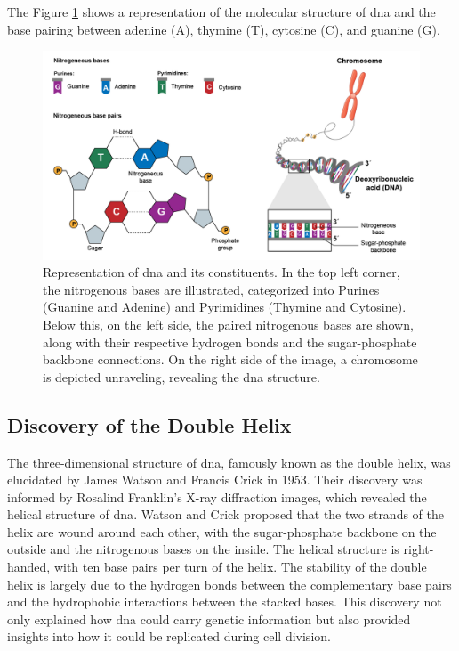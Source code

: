 The Figure \ref{fig:dna} shows a representation of the molecular structure of \ac{dna} and the base pairing between adenine (A), thymine (T), cytosine (C), and guanine (G).

\begin{figure}[H]
    \centering
    \includegraphics[width=1\textwidth]{figs/dna.png}
    \caption{Representation of \ac{dna} and its constituents. In the top left corner, the nitrogenous bases are illustrated, categorized into Purines (Guanine and Adenine) and Pyrimidines (Thymine and Cytosine). Below this, on the left side, the paired nitrogenous bases are shown, along with their respective hydrogen bonds and the sugar-phosphate backbone connections. On the right side of the image, a chromosome is depicted unraveling, revealing the \ac{dna} structure. \cite{dna}} 
    \label{fig:dna}
\end{figure}

\subsection{Discovery of the Double Helix}

The three-dimensional structure of \ac{dna}, famously known as the double helix, was elucidated by James Watson and Francis Crick in 1953. Their discovery was informed by Rosalind Franklin’s X-ray diffraction images, which revealed the helical structure of \ac{dna}. Watson and Crick proposed that the two strands of the helix are wound around each other, with the sugar-phosphate backbone on the outside and the nitrogenous bases on the inside. The helical structure is right-handed, with ten base pairs per turn of the helix. The stability of the double helix is largely due to the hydrogen bonds between the complementary base pairs and the hydrophobic interactions between the stacked bases. This discovery not only explained how \ac{dna} could carry genetic information but also provided insights into how it could be replicated during cell division. \cite{Minchin2019}

